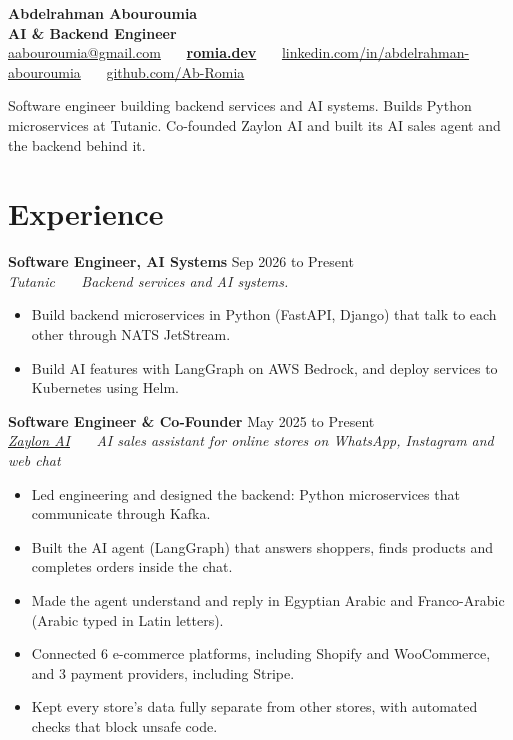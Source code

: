 \documentclass[10pt,a4paper]{article}
\newcommand{\entry}[3]{\textbf{#1} \hfill {\small\color{mutedcolor}#2}\\ \textit{#3}}
\newcommand{\gap}{\vspace{3.5pt}}
\newcommand{\sep}{\ \textbar\ \ }
\begin{document}
\begin{center}
    {\LARGE\bfseries\color{primarycolor} Abdelrahman Abouroumia}\\[3pt]
    {\normalsize\bfseries\color{secondarycolor} AI \& Backend Engineer}\\[4pt]
    \small
    \href{mailto:aabouroumia@gmail.com}{aabouroumia@gmail.com} \sep \href{https://romia.dev}{\textbf{romia.dev}} \sep \href{https://linkedin.com/in/abdelrahman-abouroumia}{linkedin.com/in/abdelrahman-abouroumia} \sep \href{https://github.com/Ab-Romia}{github.com/Ab-Romia}
\end{center}

\vspace{1pt}
Software engineer building backend services and AI systems. Builds Python microservices at Tutanic. Co-founded Zaylon AI and built its AI sales agent and the backend behind it.

\section{Experience}

\entry{Software Engineer, AI Systems}{Sep 2026 to Present}{Tutanic \sep Backend services and AI systems.}
\begin{itemize}
\item Build backend microservices in Python (FastAPI, Django) that talk to each other through NATS JetStream.
\item Build AI features with LangGraph on AWS Bedrock, and deploy services to Kubernetes using Helm.
\end{itemize}

\gap
\entry{Software Engineer \& Co-Founder}{May 2025 to Present}{\href{https://zaylon.ai}{Zaylon AI} \sep AI sales assistant for online stores on WhatsApp, Instagram and web chat}
\begin{itemize}
\item Led engineering and designed the backend: Python microservices that communicate through Kafka.
\item Built the AI agent (LangGraph) that answers shoppers, finds products and completes orders inside the chat.
\item Made the agent understand and reply in Egyptian Arabic and Franco-Arabic (Arabic typed in Latin letters).
\item Connected 6 e-commerce platforms, including Shopify and WooCommerce, and 3 payment providers, including Stripe.
\item Kept every store's data fully separate from other stores, with automated checks that block unsafe code.
\end{itemize}
\end{document}
